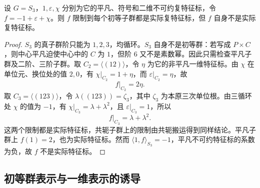 \begin{proposition}\label{b5:prop:brauer-positive-restriction-failure}
	设 \(G=S_3\)，\(1,\varepsilon,\chi\) 分别为它的平凡、符号和二维不可约复特征标，令 \(f=-1+\varepsilon+\chi\)。则 \(f\) 限制到每个初等子群都是实际复特征标，但 \(f\) 自身不是实际复特征标。
\end{proposition}
\begin{proof}
	\(S_3\) 的真子群阶只能为 \(1,2,3\)，均循环。\(S_3\) 自身不是初等群：若写成 \(P\times C\)，则中心平凡迫使中心中的 \(C\) 为 \(1\)，但阶 \(6\) 又不是素数幂。因此只需检查平凡子群及二阶、三阶子群。取 \(C_2=\langle(12)\rangle\)，令 \(\eta\) 为它的非平凡一维特征标。由 \(\chi\) 在单位元、换位处的值 \(2,0\)，有 \(\chi|_{C_2}=1+\eta\)，而 \(\varepsilon|_{C_2}=\eta\)，故
	\[
		f|_{C_2}=2\eta.
	\]
	取 \(C_3=\langle(123)\rangle\)，令 \(\lambda((123))=\zeta_3\)，其中 \(\zeta_3\) 为本原三次单位根。由三循环处 \(\chi\) 的值为 \(-1\)，有 \(\chi|_{C_3}=\lambda+\lambda^2\)，且 \(\varepsilon|_{C_3}=1\)，所以
	\[
		f|_{C_3}=\lambda+\lambda^2.
	\]
	这两个限制都是实际特征标，共轭子群上的限制由共轭搬运得到同样结论。平凡子群上 \(f(1)=2\)，也为实际特征标。然而 \(\langle1,f\rangle_{S_3}=-1\)，平凡不可约特征标的系数为负，故 \(f\) 不是实际特征标。
\end{proof}

\subsection{初等群表示与一维表示的诱导}
\label{b5:subsec:0504:04}

